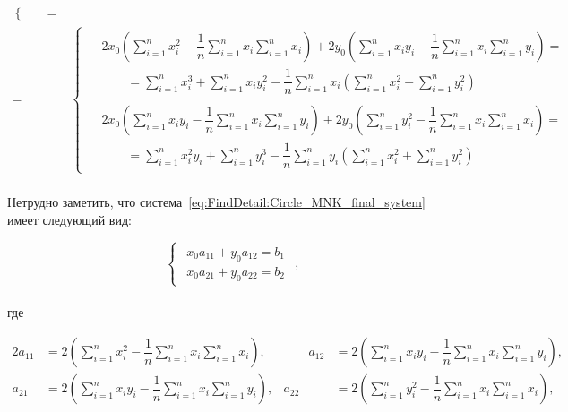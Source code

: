 \begin{align}
\begin{cases}
\begin{aligned}
           \end{aligned}
    \end{cases} = \\
    = &\begin{cases}
           \label{eq:FindDetail:Circle_MNK_final_system}
           \begin{aligned}
               &2 x_0 \left( \sum_{i=1}^{n} x_i^2 - \dfrac{1}{n} \sum_{i=1}^{n} x_i \sum_{i=1}^{n} x_i \right)
               + 2 y_0 \left( \sum_{i=1}^{n} x_i y_i
               - \dfrac{1}{n} \sum_{i=1}^{n} x_i \sum_{i=1}^{n} y_i \right) = \\
               &\qquad = \sum_{i=1}^{n} x_i^3 + \sum_{i=1}^{n} x_i y_i^2
               - \dfrac{1}{n} \sum_{i=1}^{n} x_i \left( \sum_{i=1}^{n} x_i^2 + \sum_{i=1}^{n} y_i^2 \right) \\
               \\
               &2 x_0 \left( \sum_{i=1}^{n} x_i y_i
               - \dfrac{1}{n} \sum_{i=1}^{n} x_i \sum_{i=1}^{n} y_i \right)
               + 2 y_0 \left( \sum_{i=1}^{n} y_i^2 - \dfrac{1}{n} \sum_{i=1}^{n} x_i \sum_{i=1}^{n} x_i \right) = \\
               &\qquad = \sum_{i=1}^{n} x_i^2 y_i + \sum_{i=1}^{n} y_i^3
               - \dfrac{1}{n} \sum_{i=1}^{n} y_i \left( \sum_{i=1}^{n} x_i^2 + \sum_{i=1}^{n} y_i^2 \right)
           \end{aligned}
    \end{cases}
\end{align} \\

Нетрудно заметить, что система~\ref{eq:FindDetail:Circle_MNK_final_system} имеет следующий вид:

\begin{equation}
    \label{eq:FindDetail:SLAU_system}
    \begin{cases}
        \begin{aligned}
            x_0 a_{11} + y_0 a_{12} = b_1
            \\
            x_0 a_{21} + y_0 a_{22} = b_2
        \end{aligned}
    \end{cases},
\end{equation} \\
где

\begin{alignat*}{2}
    a_{11} &= 2 \left( \sum_{i=1}^{n} x_i^2 - \dfrac{1}{n} \sum_{i=1}^{n} x_i \sum_{i=1}^{n} x_i \right), & \qquad
    a_{12} &= 2 \left( \sum_{i=1}^{n} x_i y_i - \dfrac{1}{n} \sum_{i=1}^{n} x_i \sum_{i=1}^{n} y_i \right), \\
    a_{21} &= 2 \left( \sum_{i=1}^{n} x_i y_i - \dfrac{1}{n} \sum_{i=1}^{n} x_i \sum_{i=1}^{n} y_i \right), &
    a_{22} &= 2 \left( \sum_{i=1}^{n} y_i^2 - \dfrac{1}{n} \sum_{i=1}^{n} x_i \sum_{i=1}^{n} x_i \right),
\end{alignat*} \\

